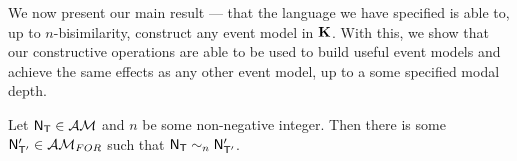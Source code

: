 %

We now present our main result --- that the language we have specified is able to, up to
$n$-bisimilarity, construct any event model in $\bf K$.
With this, we show that our constructive operations are able to be used to build useful event models
and achieve the same effects as any other event model, up to a some specified modal depth.

\begin{thm} \label{approximatingEventModel}
Let $\mathrm{\mathsf{N}}_\mathrm{\mathsf{T}} \in \mathcal{AM}$ and $n$ be some non-negative integer.
Then there is some $\mathrm{\mathsf{N}}'_{\mathrm{\mathsf{T}}'} \in \mathcal{AM}_{FOR}$ such that $\mathrm{\mathsf{N}}_\mathrm{\mathsf{T}} \sim_n \mathrm{\mathsf{N}}'_{\mathrm{\mathsf{T}}'}$.
\end{thm}

